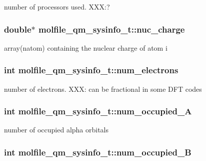 number of processors used. \-X\-X\-X\-:? \hypertarget{structmolfile__qm__sysinfo__t_ad6978efaba2f2536a9cc7d72fb111e8c}{
\subsubsection[{nuc\-\_\-charge}]{\setlength{\rightskip}{0pt plus 5cm}double$\ast$ {\bf molfile\-\_\-qm\-\_\-sysinfo\-\_\-t\-::nuc\-\_\-charge}}}\label{structmolfile__qm__sysinfo__t_ad6978efaba2f2536a9cc7d72fb111e8c}
array(natom) containing the nuclear charge of atom i \hypertarget{structmolfile__qm__sysinfo__t_af404a054742733a12370337ab16e8402}{
\subsubsection[{num\-\_\-electrons}]{\setlength{\rightskip}{0pt plus 5cm}int {\bf molfile\-\_\-qm\-\_\-sysinfo\-\_\-t\-::num\-\_\-electrons}}}\label{structmolfile__qm__sysinfo__t_af404a054742733a12370337ab16e8402}
number of electrons. \-X\-X\-X\-: can be fractional in some \-D\-F\-T codes \hypertarget{structmolfile__qm__sysinfo__t_abedde2233b27f6e8f90969b4803bb916}{
\subsubsection[{num\-\_\-occupied\-\_\-\-A}]{\setlength{\rightskip}{0pt plus 5cm}int {\bf molfile\-\_\-qm\-\_\-sysinfo\-\_\-t\-::num\-\_\-occupied\-\_\-\-A}}}\label{structmolfile__qm__sysinfo__t_abedde2233b27f6e8f90969b4803bb916}
number of occupied alpha orbitals \hypertarget{structmolfile__qm__sysinfo__t_ab5d5296c0be3d877a973dfd1ea2affe9}{
\subsubsection[{num\-\_\-occupied\-\_\-\-B}]{\setlength{\rightskip}{0pt plus 5cm}int {\bf molfile\-\_\-qm\-\_\-sysinfo\-\_\-t\-::num\-\_\-occupied\-\_\-\-B}}}\label{structmolfile__qm__sysinfo__t_ab5d5296c0be3d877a973dfd1ea2affe9}
